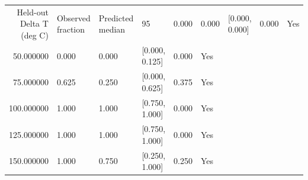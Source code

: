 \begin{tabular}{rlllll}
\toprule
Held-out Delta T (deg C) & Observed fraction & Predicted median & 95%
 & 0.000 & 0.000 & [0.000, 0.000] & 0.000 & Yes \\
50.000000 & 0.000 & 0.000 & [0.000, 0.125] & 0.000 & Yes \\
75.000000 & 0.625 & 0.250 & [0.000, 0.625] & 0.375 & Yes \\
100.000000 & 1.000 & 1.000 & [0.750, 1.000] & 0.000 & Yes \\
125.000000 & 1.000 & 1.000 & [0.750, 1.000] & 0.000 & Yes \\
150.000000 & 1.000 & 0.750 & [0.250, 1.000] & 0.250 & Yes \\
\bottomrule
\end{tabular}

